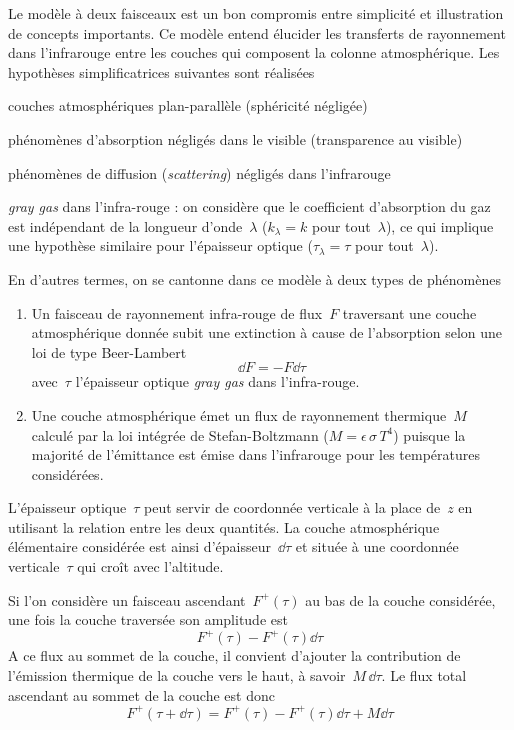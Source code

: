 \sk
Le modèle à deux faisceaux est un bon compromis entre simplicité
et illustration de concepts importants. Ce modèle entend élucider
les transferts de rayonnement dans l'infrarouge entre
les couches qui composent la colonne atmosphérique. Les
hypothèses simplificatrices suivantes sont réalisées
\begin{citemize}
\item couches atmosphériques plan-parallèle (sphéricité négligée)
\item phénomènes d'absorption négligés dans le visible (transparence au visible)
\item phénomènes de diffusion (\emph{scattering}) négligés dans l'infrarouge
\item \emph{gray gas} dans l'infra-rouge : on considère que le coefficient d'absorption
du gaz est indépendant de la longueur d'onde~$\lambda$ ($k_{\lambda} = k$ pour tout~$\lambda$),
ce qui implique une hypothèse similaire pour l'épaisseur optique ($\tau_{\lambda} = \tau$ pour tout~$\lambda$).
\end{citemize}
En d'autres termes, on se cantonne dans ce modèle à deux types de phénomènes
\begin{enumerate}
\item Un faisceau de rayonnement infra-rouge de flux~$F$ traversant une couche 
atmosphérique donnée
subit une extinction à cause de l'absorption selon une loi de type Beer-Lambert
\[
\dd F = - F \dd \tau
\]
avec~$\tau$ l'épaisseur optique \emph{gray gas} 
dans l'infra-rouge.
\item Une couche atmosphérique émet un flux de rayonnement thermique~$M$ 
calculé par la loi intégrée de Stefan-Boltzmann ($M=\epsilon\,\sigma\,T^4$)
puisque la majorité de l'émittance est émise dans l'infrarouge pour les températures considérées.
\end{enumerate}

\sk
L'épaisseur optique~$\tau$ peut servir de coordonnée verticale à la place de~$z$
en utilisant la relation entre les deux quantités. La couche atmosphérique
élémentaire considérée est ainsi d'épaisseur~$\dd\tau$ et située à une coordonnée
verticale~$\tau$ qui croît avec l'altitude. 

\sk
Si l'on considère un faisceau ascendant~$F^+(\tau)$ au bas de la couche considérée,
une fois la couche traversée son amplitude est
\[
F^+(\tau) - F^+(\tau) \dd\tau
\]
A ce flux au sommet de la couche, il convient d'ajouter
la contribution de l'émission thermique de la couche vers 
le haut, à savoir~$M\,\dd\tau$.
Le flux total ascendant au sommet de la couche est donc
\[
F^+(\tau+\dd\tau) = F^+(\tau) - F^+(\tau) \dd\tau + M\dd\tau
\]

